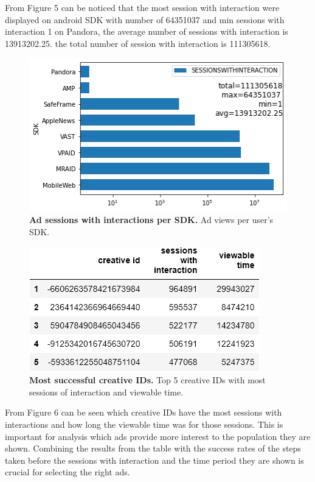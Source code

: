 \documentclass[fleqn,moreauthors,10pt]{ds_report}
\begin{document}
From Figure 5 can be noticed that the most session with interaction were displayed on android SDK with number of 64351037 and min sessions with interaction 1 on Pandora, the average number of sessions with interaction is 13913202.25. the total number of session with interaction is 111305618.
\begin{figure}\centering
	\includegraphics[width=\linewidth]{PlatformUsageSession.png}
	\caption{\textbf{Ad sessions with interactions per SDK.} Ad views per user's SDK.}
	\label{fig:column}
\end{figure}

\begin{figure}\centering
	\includegraphics[width=\linewidth]{tableCreativeid.png}
	\caption{\textbf{Most successful creative IDs.} Top 5 creative IDs with most sessions of interaction and viewable time.}
	\label{fig:column}
\end{figure}
From Figure 6 can be seen which creative IDs have the most sessions with interactions and how long the viewable time  was for those sessions. This is important for analysis which ads provide more interest to the population they are shown. Combining the results from the table with the success rates of the steps taken before the sessions with interaction and the time period they are shown is crucial for selecting the right ads.
\end{document}
